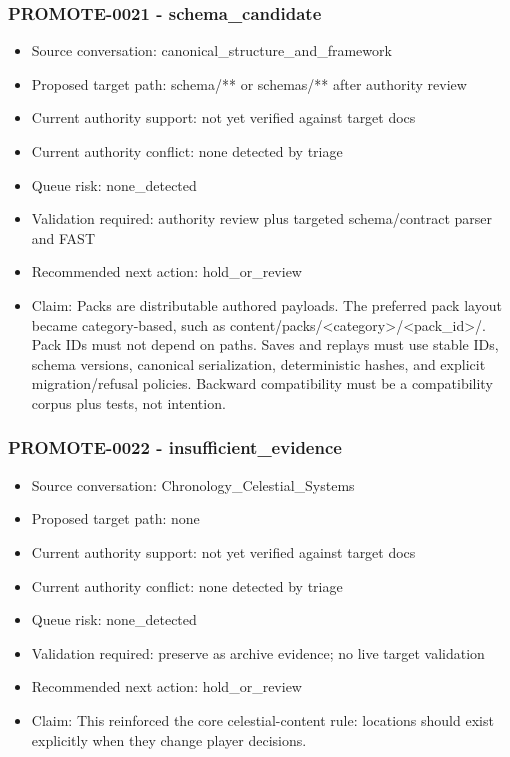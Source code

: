 \documentclass[11pt,a4paper]{report}
\begin{document}
\subsubsection{PROMOTE-0021 - schema\_candidate}

\begin{itemize}
\item Source conversation: canonical\_structure\_and\_framework
\item Proposed target path: schema/** or schemas/** after authority review
\item Current authority support: not yet verified against target docs
\item Current authority conflict: none detected by triage
\item Queue risk: none\_detected
\item Validation required: authority review plus targeted schema/contract parser and FAST
\item Recommended next action: hold\_or\_review
\item Claim: Packs are distributable authored payloads. The preferred pack layout became category-based, such as content/packs/<category>/<pack\_id>/. Pack IDs must not depend on paths. Saves and replays must use stable IDs, schema versions, canonical serialization, deterministic hashes, and explicit migration/refusal policies. Backward compatibility must be a compatibility corpus plus tests, not intention.
\end{itemize}

\subsubsection{PROMOTE-0022 - insufficient\_evidence}

\begin{itemize}
\item Source conversation: Chronology\_Celestial\_Systems
\item Proposed target path: none
\item Current authority support: not yet verified against target docs
\item Current authority conflict: none detected by triage
\item Queue risk: none\_detected
\item Validation required: preserve as archive evidence; no live target validation
\item Recommended next action: hold\_or\_review
\item Claim: This reinforced the core celestial-content rule: locations should exist explicitly when they change player decisions.
\end{itemize}
\end{document}
